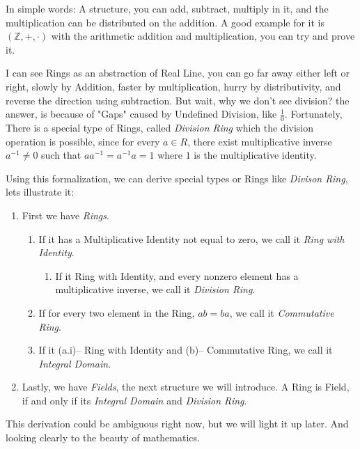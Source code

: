 In simple words: A structure, you can add, subtract, multiply in it, and the multiplication can be distributed on the addition. A good example for it is $(\mathbb{Z},+,\cdot)$ with the arithmetic addition and multiplication, you can try and prove it.

I can see Rings as an abstraction of Real Line, you can go far away either left or right, slowly by Addition, faster by multiplication, hurry by distributivity,  and reverse the direction using subtraction. But wait, why we don't see division? the answer, is because of "Gaps" caused by Undefined Division, like $\frac{1}{0}$. Fortunately, There is a special type of Rings, called {\it Division Ring} which the division operation is possible, since for every $a \in R$, there exist multiplicative inverse $a^{-1} \neq 0$ such that $aa^{-1}=a^{-1}a=1$ where $1$ is the multiplicative identity.

Using this formalization, we can derive special types or Rings like {\it Divison Ring}, lets illustrate it: \begin{enumerate}
    \item First we have {\it Rings}.
    \begin{enumerate}
        \item If it has a Multiplicative Identity not equal to zero, we call it {\it Ring with Identity}.
            \begin{enumerate}
                \item If it Ring with Identity, and every nonzero element has a multiplicative inverse, we call it {\it Division Ring}. 
            \end{enumerate}
        \item If for every two element in the Ring, $ab=ba$, we call it {\it Commutative Ring}.
        \item If it (a.i)-- Ring with Identity and (b)-- Commutative Ring, we call it {\it Integral Domain}.
    \end{enumerate}
    \item Lastly, we have {\it Fields}, the next structure we will introduce. A Ring is Field, if and only if its {\it Integral Domain} and {\it Division Ring}.
\end{enumerate}

This derivation could be ambiguous right now, but we will light it up later. And looking clearly to the beauty of mathematics.